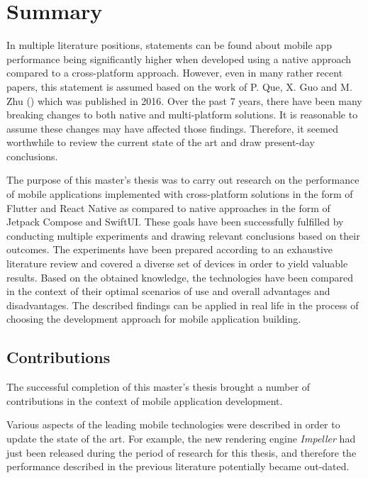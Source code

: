 
\chapter{Summary}

In multiple literature positions, statements can be found about mobile app performance being significantly higher when developed using a native approach compared to a cross-platform approach. However, even in many rather recent papers, this statement is assumed based on the work of P. Que, X. Guo and M. Zhu (\cite{que_comp_hybrid_native}) which was published in 2016. Over the past 7 years, there have been many breaking changes to both native and multi-platform solutions. It is reasonable to assume these changes may have affected those findings. Therefore, it seemed worthwhile to review the current state of the art and draw present-day conclusions.

The purpose of this master's thesis was to carry out research on the performance of mobile applications implemented with cross-platform solutions in the form of Flutter and React Native as compared to native approaches in the form of Jetpack Compose and SwiftUI. These goals have been successfully fulfilled by conducting multiple experiments and drawing relevant conclusions based on their outcomes. The experiments have been prepared according to an exhaustive literature review and covered a diverse set of devices in order to yield valuable results. Based on the obtained knowledge, the technologies have been compared in the context of their optimal scenarios of use and overall advantages and disadvantages. The described findings can be applied in real life in the process of choosing the development approach for mobile application building.

\section{Contributions}

The successful completion of this master's thesis brought a number of contributions in the context of mobile application development.

Various aspects of the leading mobile technologies were described in order to update the state of the art. For example, the new rendering engine \emph{Impeller} had just been released during the period of research for this thesis, and therefore the performance described in the previous literature potentially became out-dated.

